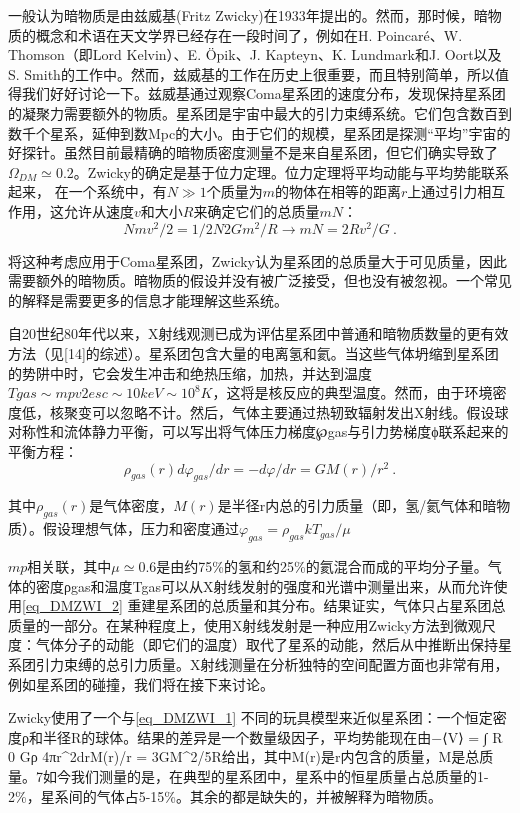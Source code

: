

一般认为暗物质是由兹威基(Fritz Zwicky)在1933年提出的。然而，那时候，暗物质的概念和术语在天文学界已经存在一段时间了，例如在H. Poincaré、W. Thomson（即Lord Kelvin）、E. Öpik、J. Kapteyn、K. Lundmark和J. Oort以及S. Smith的工作中。然而，兹威基的工作在历史上很重要，而且特别简单，所以值得我们好好讨论一下。兹威基通过观察Coma星系团的速度分布，发现保持星系团的凝聚力需要额外的物质。星系团是宇宙中最大的引力束缚系统。它们包含数百到数千个星系，延伸到数Mpc的大小。由于它们的规模，星系团是探测“平均”宇宙的好探针。虽然目前最精确的暗物质密度测量不是来自星系团，但它们确实导致了$\Omega_{DM} \simeq 0.2$。Zwicky的确定是基于位力定理。位力定理将平均动能与平均势能联系起来，%
在一个系统中，有$N \gg 1$个质量为$m$的物体在相等的距离$r$上通过引力相互作用，这允许从速度$v$和大小$R$来确定它们的总质量$mN$：
\begin{equation}\label{eq_DMZWI_1}
N mv^2 / 2 = 1/2 N2 G m^2 / R \rightarrow mN = 2R v^2 / G  ~.
\end{equation}


将这种考虑应用于Coma星系团，Zwicky认为星系团的总质量大于可见质量，因此需要额外的暗物质。暗物质的假设并没有被广泛接受，但也没有被忽视。一个常见的解释是需要更多的信息才能理解这些系统。

自20世纪80年代以来，X射线观测已成为评估星系团中普通和暗物质数量的更有效方法（见[14]的综述）。星系团包含大量的电离氢和氦。当这些气体坍缩到星系团的势阱中时，它会发生冲击和绝热压缩，加热，并达到温度$Tgas ∼ mpv2 esc ∼ 10 keV ∼ 10^8 K$，这将是核反应的典型温度。然而，由于环境密度低，核聚变可以忽略不计。然后，气体主要通过热轫致辐射发出X射线。假设球对称性和流体静力平衡，可以写出将气体压力梯度℘gas与引力势梯度ϕ联系起来的平衡方程：
\begin{equation}\label{eq_DMZWI_2}
\rho_{gas}(r) d\varphi_{gas}/dr = - d\varphi / dr = GM(r)/ r^2~. 
\end{equation}
 

其中$\rho_{gas}(r)$是气体密度，$M(r)$是半径r内总的引力质量（即，氢/氦气体和暗物质）。假设理想气体，压力和密度通过$\varphi_{gas} = \rho_{gas}kT_{gas}/\mu$

$mp$相关联，其中$\mu\simeq 0.6$是由约75\%的氢和约25\%的氦混合而成的平均分子量。气体的密度ρgas和温度Tgas可以从X射线发射的强度和光谱中测量出来，从而允许使用\autoref{eq_DMZWI_2} 重建星系团的总质量和其分布。结果证实，气体只占星系团总质量的一部分。在某种程度上，使用X射线发射是一种应用Zwicky方法到微观尺度：气体分子的动能（即它们的温度）取代了星系的动能，然后从中推断出保持星系团引力束缚的总引力质量。X射线测量在分析独特的空间配置方面也非常有用，例如星系团的碰撞，我们将在接下来讨论。

Zwicky使用了一个与\autoref{eq_DMZWI_1} 不同的玩具模型来近似星系团：一个恒定密度ρ和半径R的球体。结果的差异是一个数量级因子，平均势能现在由−⟨V⟩ = ∫ R 0 Gρ 4πr^2drM(r)/r = 3GM^2/5R给出，其中M(r)是r内包含的质量，M是总质量。7如今我们测量的是，在典型的星系团中，星系中的恒星质量占总质量的1-2\%，星系间的气体占5-15\%。其余的都是缺失的，并被解释为暗物质。